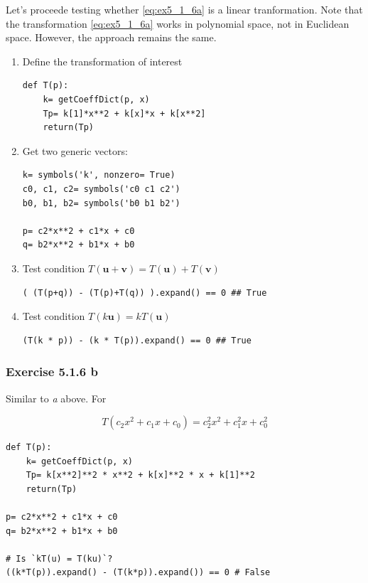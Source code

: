 Let's proceede testing whether \ref{eq:ex5_1_6a} is a linear tranformation. Note
that the transformation \ref{eq:ex5_1_6a} works in polynomial space, not in
Euclidean space. However, the approach remains the same.

\begin{enumerate}
\item{Define the transformation of interest}
\begin{verbatim}
def T(p):
    k= getCoeffDict(p, x)
    Tp= k[1]*x**2 + k[x]*x + k[x**2]
    return(Tp)
\end{verbatim}

\item{Get two generic vectors:}
\begin{verbatim}
k= symbols('k', nonzero= True)
c0, c1, c2= symbols('c0 c1 c2')
b0, b1, b2= symbols('b0 b1 b2')

p= c2*x**2 + c1*x + c0
q= b2*x**2 + b1*x + b0
\end{verbatim}

\item Test condition $T(\mathbf{u + v}) = T(\mathbf{u}) + T(\mathbf{v})$
\begin{verbatim}
( (T(p+q)) - (T(p)+T(q)) ).expand() == 0 ## True
\end{verbatim}

\item Test condition $T(k\mathbf{u}) = kT(\mathbf{u})$
\begin{verbatim}
(T(k * p)) - (k * T(p)).expand() == 0 ## True
\end{verbatim}
\end{enumerate}

\subsubsection{Exercise 5.1.6 b}

Similar to \textit{a} above. For

$$
T(c_2 x^2 + c_1 x + c_0) = c_2^2 x^2 + c_1^2 x + c_0^2
$$

\begin{verbatim}
def T(p):
    k= getCoeffDict(p, x)
    Tp= k[x**2]**2 * x**2 + k[x]**2 * x + k[1]**2
    return(Tp)

p= c2*x**2 + c1*x + c0
q= b2*x**2 + b1*x + b0

# Is `kT(u) = T(ku)`?
((k*T(p)).expand() - (T(k*p)).expand()) == 0 # False
\end{verbatim}

